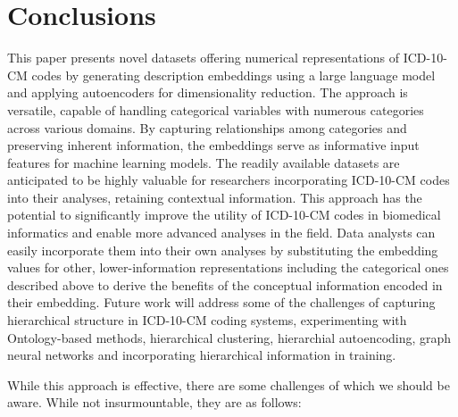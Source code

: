 \documentclass{bmcart}
\begin{document}
\section*{Conclusions}

This paper presents novel datasets offering numerical representations of 
ICD-10-CM codes by generating description embeddings using a large language 
model and applying autoencoders for dimensionality reduction. The approach is 
versatile, capable of handling categorical variables with numerous categories 
across various domains. By capturing relationships among categories and 
preserving inherent information, the embeddings serve as informative input 
features for machine learning models.  The readily available datasets are 
anticipated to be highly valuable for researchers incorporating ICD-10-CM 
codes into their analyses, retaining contextual information. This approach 
has the potential to significantly improve the utility of ICD-10-CM codes in 
biomedical informatics and enable more advanced analyses in the field.
Data analysts can easily incorporate them into their own analyses by 
substituting the embedding values for other, lower-information representations
including the categorical ones described above to derive the benefits
of the conceptual information encoded in their embedding.
Future work will address some of the challenges of capturing hierarchical
structure in ICD-10-CM coding systems, experimenting with Ontology-based 
methods, hierarchical clustering, hierarchial autoencoding, graph neural 
networks and incorporating hierarchical information in training.

While this approach is 
effective, there are some challenges of which we should be aware. While not 
insurmountable, they are as follows:
\end{document}
